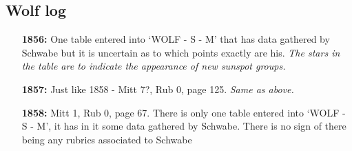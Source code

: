 \documentclass[12pt]{article}
\begin{document}
\subsection{Wolf log}
\begin{itemize}
     \item[\textbf{1856:}] One table entered into `WOLF - S - M' that has data gathered by Schwabe but it is uncertain as to which points exactly are his. \textit{The stars in the table are to indicate the appearance of new sunspot groups.}
    
     \item[\textbf{1857:}] Just like 1858 - Mitt 7?, Rub 0, page 125. \textit{Same as above.} 
    \item[\textbf{1858:}] Mitt 1, Rub 0, page 67. There is only one table entered into `WOLF - S - M', it has in it some data gathered by Schwabe. There is no sign of there being any rubrics associated to Schwabe
    

\end{itemize}
\end{document}

